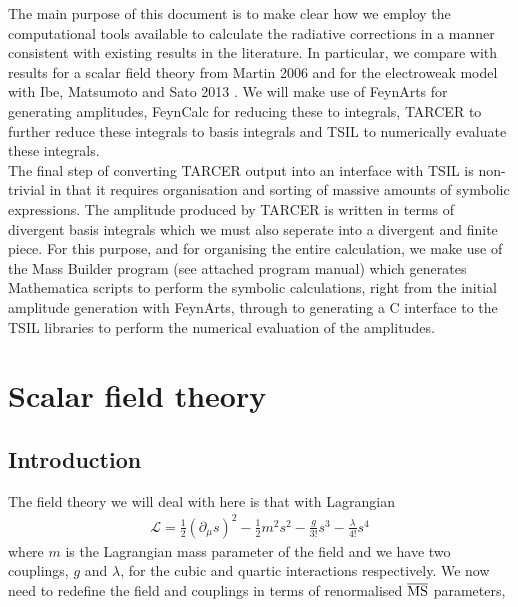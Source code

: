 \documentclass[11pt]{article}
\newcommand{\mb}{\textsf{Mass Builder} }
\newcommand{\tsil}{\textsf{TSIL} }
\newcommand{\tarcer}{\textsf{TARCER} }
\newcommand{\feynarts}{\textsf{FeynArts} }
\newcommand{\feynartss}{\textsf{FeynArts}}
\newcommand{\feyncalc}{\textsf{FeynCalc} }
\newcommand{\mathematica}{\textsf{Mathematica} }
\newcommand{\CC}{C\nolinebreak\hspace{-.05em}\raisebox{.4ex}{\tiny\bf +}\nolinebreak\hspace{-.10em}\raisebox{.4ex}{\tiny\bf +} }
\begin{document}
The main purpose of this document is to make clear how we employ the computational tools available to calculate the radiative corrections in a manner consistent with existing results in the literature.  In particular, we compare with results for a scalar field theory from Martin 2006 \cite{Martin2006} and for the electroweak model with Ibe, Matsumoto and Sato 2013 \cite{Ibe2013a}.  We will make use of \feynarts \cite{Hahn2000} for generating amplitudes, \feyncalc \cite{Mertig1991,Shtabovenko2016} for reducing these to integrals, \tarcer \cite{Mertig1998} to further reduce these integrals to basis integrals and \tsil \cite{Martin2006} to numerically evaluate these integrals.\\

The final step of converting \tarcer output into an interface with \tsil is non-trivial in that it requires organisation and sorting of massive amounts of symbolic expressions.  The amplitude produced by \tarcer is written in terms of divergent basis integrals which we must also seperate into a divergent and finite piece.  For this purpose, and for organising the entire calculation, we make use of the \mb program (see attached program manual) which generates \mathematica scripts to perform the symbolic calculations, right from the initial amplitude generation with \feynartss, through to generating a \CC interface to the \tsil libraries to perform the numerical evaluation of the amplitudes.


\section{Scalar field theory}
\subsection{Introduction}

The field theory we will deal with here is that with Lagrangian
\begin{align}
\mathcal{L} = \frac{1}{2}(\partial_{\mu} s)^2-\frac{1}{2}m^2s^2-\frac{g}{3!}s^3-\frac{\lambda}{4!}s^4
\end{align}
where $m$ is the Lagrangian mass parameter of the field and we have two couplings, $g$ and $\lambda$, for the cubic and quartic interactions respectively.  We now need to redefine the field and couplings in terms of renormalised \mbox{\footnotesize$\overline{\rm MS}~$}parameters,
\end{document}
